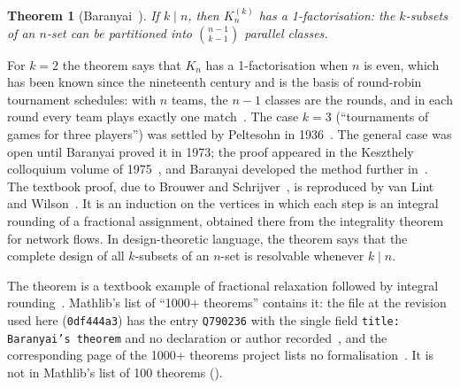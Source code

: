 \documentclass[11pt]{article}
\newtheorem{theorem}{Theorem}
\theoremstyle{definition}
\theoremstyle{remark}
\begin{document}
\begin{theorem}[Baranyai~\cite{Baranyai1975}]\label{thm:baranyai}
If $k\mid n$, then $K_n^{(k)}$ has a 1-factorisation: the $k$-subsets of an $n$-set can be
partitioned into $\binom{n-1}{k-1}$ parallel classes.
\end{theorem}

For $k=2$ the theorem says that $K_n$ has a 1-factorisation when $n$ is even, which has been known
since the nineteenth century and is the basis of round-robin tournament schedules: with $n$ teams,
the $n-1$ classes are the rounds, and in each round every team plays exactly one
match~\cite{MendelsohnRosa}. The case $k=3$ (``tournaments of games for three players'') was
settled by Peltesohn in 1936~\cite{Peltesohn}. The general case was open until Baranyai proved it
in 1973; the proof appeared in the Keszthely colloquium volume of 1975~\cite{Baranyai1975}, and
Baranyai developed the method further in~\cite{Baranyai1979}. The textbook proof, due to Brouwer and
Schrijver~\cite{BrouwerSchrijver}, is reproduced by van Lint and Wilson~\cite[Ch.~38]{vLW}. It is
an induction on the vertices in which each step is an integral rounding of a fractional
assignment, obtained there from the integrality theorem for network flows. In design-theoretic
language, the theorem says that the complete design of all $k$-subsets of an $n$-set is
resolvable whenever $k\mid n$.

The theorem is a textbook example of fractional relaxation followed by integral
rounding~\cite[Ch.~38]{vLW}.
Mathlib's list of ``1000+ theorems'' contains it: the file  at the
revision used here (\texttt{0df444a3}) has the entry \texttt{Q790236} with the single field
\texttt{title: Baranyai's theorem} and no declaration or author recorded~\cite{Mathlib1000}, and the
corresponding page of the 1000+ theorems project lists no formalisation~\cite{Plus1000}. It is not
in Mathlib's list of 100 theorems ().
\end{document}
